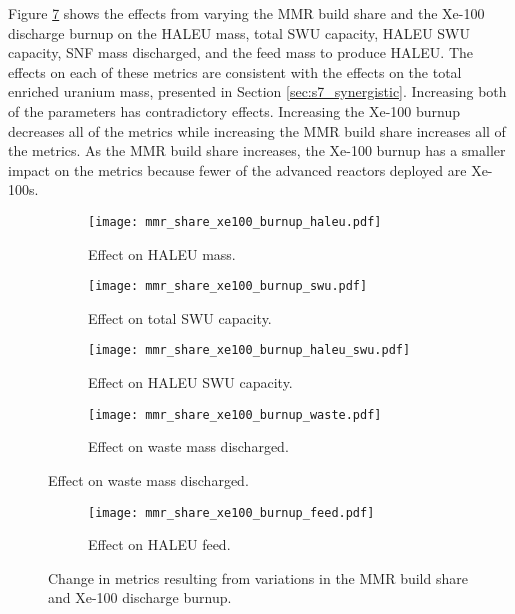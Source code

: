 Figure \ref{fig:mmr_share_xe100_burnup} shows the effects from varying 
the \gls{MMR} build share and the Xe-100 discharge burnup on the 
\gls{HALEU} mass, total \gls{SWU} capacity, \gls{HALEU} \gls{SWU} 
capacity, \gls{SNF} mass discharged, and the feed mass to produce \gls{HALEU}. 
The effects on each of these metrics are consistent with the effects on 
the total enriched uranium mass, presented in Section \ref{sec:s7_synergistic}.
Increasing both of the parameters has contradictory effects. Increasing the 
Xe-100 burnup decreases all of the metrics while increasing the \gls{MMR} 
build share increases all of the metrics. As the \gls{MMR} build share 
increases, the Xe-100 burnup has a smaller impact on the metrics because 
fewer of the advanced reactors deployed are Xe-100s. 


\begin{figure}
    \begin{subfigure}[t]{0.48\textwidth}
        \centering
        \texttt{[image: mmr\_share\_xe100\_burnup\_haleu.pdf]}
        \caption{Effect on HALEU mass.}
        \label{fig:mmr_share_xe100_burnup_haleu}
    \end{subfigure}
    \hfill 
    \begin{subfigure}[t]{0.48\textwidth}
        \centering
        \texttt{[image: mmr\_share\_xe100\_burnup\_swu.pdf]}
        \caption{Effect on total SWU capacity.}
        \label{fig:mmr_share_xe100_burnup_swu}
    \end{subfigure}
    \hfill
    \begin{subfigure}[t]{0.48\textwidth}
        \centering
        \texttt{[image: mmr\_share\_xe100\_burnup\_haleu\_swu.pdf]}
        \caption{Effect on HALEU SWU capacity.}
        \label{fig:mmr_share_xe100_burnup_haleu_swu}
    \end{subfigure}
    \hfill
    \begin{subfigure}[t]{0.48\textwidth}
        \centering
        \texttt{[image: mmr\_share\_xe100\_burnup\_waste.pdf]}
        \caption{Effect on waste mass discharged.}
        \label{fig:mmr_share_xe100_burnup_waste}
    \end{subfigure}
\end{figure}

\begin{figure}
    \ContinuedFloat
    \begin{subfigure}[t]{0.48\textwidth}
        \centering
        \texttt{[image: mmr\_share\_xe100\_burnup\_feed.pdf]}
        \caption{Effect on HALEU feed.}
        \label{fig:mmr_share_xe100_burnup_feed}
    \end{subfigure}
    \caption{Change in metrics resulting from variations in the 
    MMR build share and Xe-100 discharge burnup.}
    \label{fig:mmr_share_xe100_burnup}
\end{figure}

